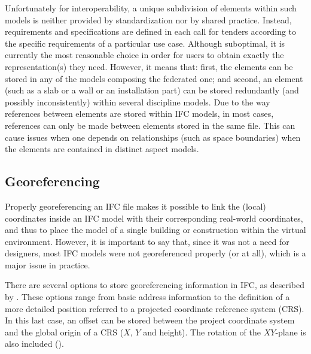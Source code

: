 Unfortunately for interoperability, a unique subdivision of elements within such models is neither provided by standardization nor by shared practice.
Instead, requirements and specifications are defined in each call for tenders according to the specific requirements of a particular use case.
Although suboptimal, it is currently the most reasonable choice in order for users to obtain exactly the representation(s) they need.
However, it means that: first, the elements can be stored in any of the models composing the federated one; and second, an element (such as a slab or a wall or an installation part) can be stored redundantly (and possibly inconsistently) within several discipline models.
Due to the way references between elements are stored within IFC models, in most cases, references can only be made between elements stored in the same file. This can cause issues when one depends on relationships (such as space boundaries) when the elements are contained in distinct aspect models.
%


\subsection{Georeferencing}

Properly georeferencing an IFC file makes it possible to link the (local) coordinates inside an IFC model with their corresponding real-world coordinates, and thus to place the model of a single building or construction within the virtual environment.
However, it is important to say that, since it was not a need for designers, most IFC models were not georeferenced properly (or at all), which is a major issue in practice.


There are several options to store georeferencing information in IFC, as described by \citet{clemen2019level}. %
These options range from basic address information to the definition of a more detailed position referred to a projected coordinate reference system (CRS).
In this last case, an offset can be stored between the project coordinate system and the global origin of a CRS ($X$, $Y$ and height).
The rotation of the $XY$-plane is also included ().

